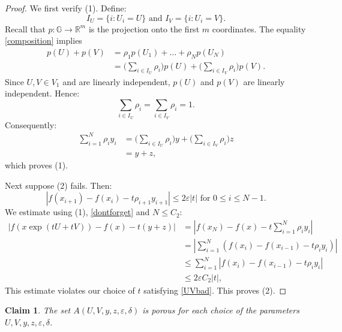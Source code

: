 \documentclass[reqno, 11pt]{amsart}
\newtheorem{claim}[theorem]{Claim}
\theoremstyle{definition}
\theoremstyle{remark}
\numberwithin{theorem}{section}
\numberwithin{equation}{section}
\begin{document}
\begin{proof}
We first verify (1). Define:
\[I_{U}=\{i: U_{i}=U\} \mbox{ and } I_{V}=\{i: U_{i}=V\}.\]
Recall that $p\colon \mathbb{G}\to \mathbb{R}^{m}$ is the projection onto the first $m$ coordinates. The equality \eqref{composition} implies
\begin{align*}
p(U)+p(V)&=\rho_{1}p(U_{1})+\ldots +\rho_{N}p(U_{N})\\
&= \Big(\sum_{i\in I_{U}} \rho_{i}\Big) p(U) + \Big(\sum_{i\in I_{V}} \rho_{i}\Big) p(V).
\end{align*}
Since $U, V\in V_{1}$ and are linearly independent, $p(U)$ and $p(V)$ are linearly independent. Hence:
\[  \sum_{i\in I_{U}} \rho_{i} =  \sum_{i\in I_{V}} \rho_{i}   =1.\]
Consequently:
\begin{align*}
\sum_{i=1}^{N}\rho_{i}y_{i}&= \Big(\sum_{i\in I_{U}} \rho_{i}\Big)y + \Big(\sum_{i\in I_{V}} \rho_{i}\Big)z\\
&=y+z,
\end{align*}
which proves (1).

Next suppose (2) fails. Then:
\begin{equation}\label{dontforget}
|f(x_{i+1})-f(x_{i})-t\rho_{i+1}y_{i+1}|\leq 2\varepsilon |t| \mbox{ for }0\leq i\leq N-1.
\end{equation}
We estimate using (1), \eqref{dontforget} and $N\leq C_{2}$:
\begin{align*}
| f(x\exp(tU+tV))-f(x)-t(y+z) | &= \left| f(x_{N})-f(x)-t\sum_{i=1}^{N} \rho_{i}y_{i}\right|\\
&=\left| \sum_{i=1}^{N} (f(x_{i})-f(x_{i-1})-t\rho_{i}y_{i}) \right|\\
&\leq \sum_{i=1}^{N} |f(x_{i})-f(x_{i-1})-t\rho_{i}y_{i}|\\
&\leq 2\varepsilon C_{2}|t|,
\end{align*}
This estimate violates our choice of $t$ satisfying \eqref{UVbad}. This proves (2).
\end{proof}

\begin{claim}\label{claim2}
The set $A(U,V,y,z,\varepsilon,\delta)$ is porous for each choice of the parameters $U, V, y, z, \varepsilon, \delta$.
\end{claim}
\end{document}
